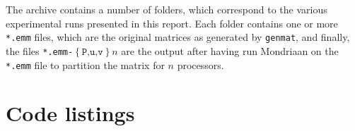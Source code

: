 \documentclass[a4paper]{article}
\begin{document}
The archive contains a number of folders, which correspond to the various experimental runs
presented in this report. Each folder contains one or more \texttt{*.emm} files, which are the original
matrices as generated by \texttt{genmat}, and finally, the files \texttt{*.emm-$\left\{\texttt{P,u,v}\right\}n$} are
the output after having run Mondriaan on the \texttt{*.emm} file to partition the matrix for $n$ processors.



\section{Code listings}




\end{document}
